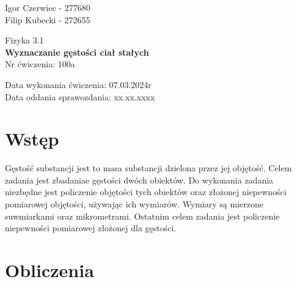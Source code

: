 \documentclass[11pt]{article}
\begin{document}
    \begin{flushright}
        \large{
            Igor Czerwiec - 277680\\
            Filip Kubecki - 272655
        }\\
    \end{flushright}
    \begin{center}
        \large{Fizyka 3.1}\\
        \vspace{2mm}
        \LARGE{\textbf{Wyznaczanie gęstości ciał stałych}}\\
        \vspace{3mm}
        \huge{Nr ćwiczenia: 100a}\\
        \vspace{1cm}
    \end{center}
    \begin{flushright}
        \large{
            Data wykonania ćwiczenia: 07.03.2024r\\
            Data oddania sprawozdania: xx.xx.xxxx
        }\\
    \end{flushright}
    \section{Wstęp}
    Gęstość substancji jest to masa substancji dzielona przez jej objętość. Celem zadania jest zbadaniae gęstości dwóch obiektów. Do wykonania zadania niezbędne jest policzenie objętości tych obiektów oraz złożonej niepewności pomiarowej objętości, używając ich wymiarów. Wymiary są mierzone suwmiarkami oraz mikrometrami.  Ostatnim celem zadania jest policzenie niepewności pomiarowej złożonej dla gęstości.
    \section{Obliczenia}
\end{document}

